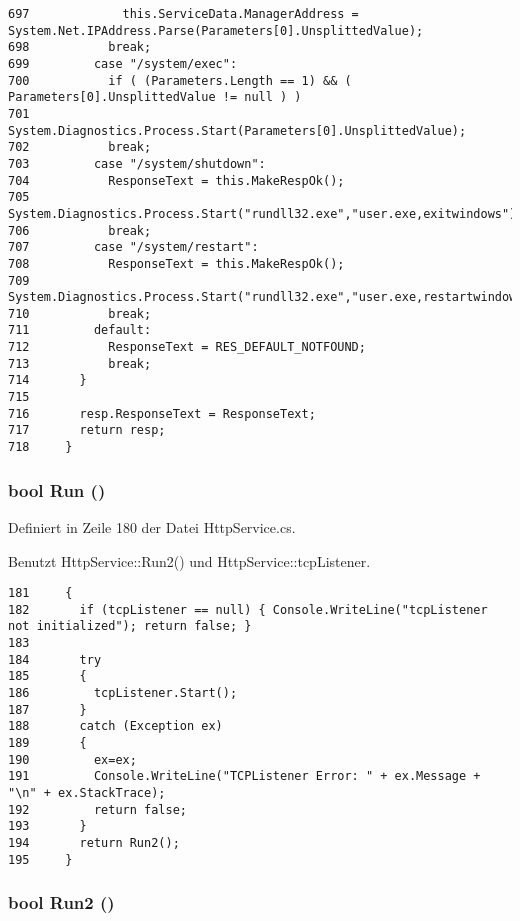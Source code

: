 \begin{verbatim}
697             this.ServiceData.ManagerAddress = System.Net.IPAddress.Parse(Parameters[0].UnsplittedValue);
698           break;
699         case "/system/exec":
700           if ( (Parameters.Length == 1) && ( Parameters[0].UnsplittedValue != null ) ) 
701             System.Diagnostics.Process.Start(Parameters[0].UnsplittedValue);
702           break;
703         case "/system/shutdown":
704           ResponseText = this.MakeRespOk();
705           System.Diagnostics.Process.Start("rundll32.exe","user.exe,exitwindows");
706           break;
707         case "/system/restart":
708           ResponseText = this.MakeRespOk();
709           System.Diagnostics.Process.Start("rundll32.exe","user.exe,restartwindows");
710           break;
711         default:
712           ResponseText = RES_DEFAULT_NOTFOUND;
713           break;
714       }
715 
716       resp.ResponseText = ResponseText;
717       return resp;
718     }
\end{verbatim}\normalsize 
\hypertarget{classQbeSAS_1_1HttpService_QbeSAS_1_1HttpServicea3}{
\subsubsection[Run]{\setlength{\rightskip}{0pt plus 5cm}bool Run ()}}
\label{classQbeSAS_1_1HttpService_QbeSAS_1_1HttpServicea3}




Definiert in Zeile 180 der Datei Http\-Service.cs.

Benutzt Http\-Service::Run2() und Http\-Service::tcp\-Listener.



\footnotesize\begin{verbatim}181     {
182       if (tcpListener == null) { Console.WriteLine("tcpListener not initialized"); return false; }
183 
184       try
185       {
186         tcpListener.Start();
187       }
188       catch (Exception ex)
189       {
190         ex=ex;
191         Console.WriteLine("TCPListener Error: " + ex.Message + "\n" + ex.StackTrace);
192         return false;
193       }
194       return Run2();
195     }
\end{verbatim}\normalsize 
\hypertarget{classQbeSAS_1_1HttpService_QbeSAS_1_1HttpServiced1}{
\subsubsection[Run2]{\setlength{\rightskip}{0pt plus 5cm}bool Run2 ()}}
\label{classQbeSAS_1_1HttpService_QbeSAS_1_1HttpServiced1}





